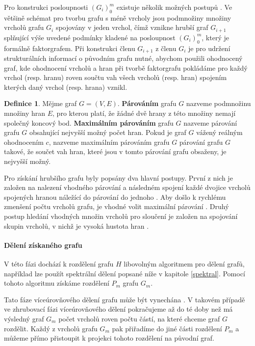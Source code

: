 \documentclass{ctuthesis}
\theoremstyle{plain}
\theoremstyle{definition}
\newtheorem{definition}{Definice}
\begin{document}
Pro konstrukci posloupnosti $(G_i)_0^m$ existuje několik možných postupů \cite{lehe:95,lehe:94}. Ve většině schémat pro tvorbu grafu s méně vrcholy jsou podmnožiny množiny vrcholů grafu $G_i$ spojovány v jeden vrchol, čímž vznikne hrubší graf $G_{i+1}$ splňující výše uvedené podmínky kladené na posloupnost $(G_i)_0^m$, který je formálně faktorgrafem. Při konstrukci členu $G_{i+1}$ z členu $G_i$ je pro udržení strukturálních informací o původním grafu nutné, abychom použili ohodnocený graf, kde ohodnocení vrcholů a hran při tvorbě faktorgrafu pokládáme pro každý vrchol (resp. hranu) roven součtu vah všech vrcholů (resp. hran) spojením kterých daný vrchol (resp. hrana) vznikl. 

\begin{definition}
  Mějme graf $G = (V, E)$. \textbf{Párováním} grafu $G$ nazveme podmnožinu množiny hran $E$, pro kterou platí, že žádné dvě hrany z této množiny nemají společný koncový bod. \textbf{Maximálním párováním} grafu $G$ nazveme párování grafu $G$ obsahující nejvyšší možný počet hran. Pokud je graf $G$ vážený reálným ohodnocením $c$, nazveme maximálním párováním grafu $G$ párování grafu $G$ takové, že součet vah hran, které jsou v tomto párování grafu obsaženy, je nejvyšší možný.
\end{definition}

Pro získání hrubšího grafu byly popsány dva hlavní postupy. První z nich je založen na nalezení vhodného párování a následném spojení každé dvojice vrcholů spojených hranou náležící do párování do jednoho \cite{edmo:65,lawl:76}. Aby došlo k rychlému zmenšení počtu vrcholů grafu, je vhodné volit maximální párování \cite{hele:95}. Druhý postup hledání vhodných množin vrcholů pro sloučení je založen na spojování skupin vrcholů, v nichž je vysoká hustota hran \cite{lehe:94}.

\paragraph{Dělení získaného grafu}
V této fázi dochází k rozdělení grafu $H$ libovolným algoritmem pro dělení grafů, například lze použít spektrální dělení popsané níže v kapitole \ref{spektral}. Pomocí tohoto algoritmu získáme rozdělení $P_m$ grafu $G_m$.

Tato fáze víceúrovňového dělení grafu může být vynechána \cite{kaku:95}. V takovém případě ve zhrubovací fázi víceúrovňového dělení pokračujeme až do té doby než má výsledný graf $G_m$ počet vrcholů roven počtu částí, na které chceme graf $G$ rozdělit. Každý z vrcholů grafu $G_m$ pak přiřadíme do jiné části rozdělení $P_m$ a můžeme přímo přistoupit k projekci tohoto rozdělení na původní graf.
\end{document}
